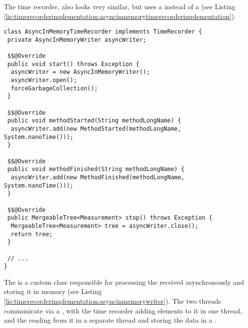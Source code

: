 \noindent The time recorder, also looks very similar, but uses a  instead of a  (see Listing \ref{lis:timerecorderimplementation:asyncinmemorytimerecorderimplementation}).

\noindent\begin{minipage}[c]{\linewidth}
\begin{lstlisting}[breaklines,caption={Async and in-memory time recorder implementation},label=lis:timerecorderimplementation:asyncinmemorytimerecorderimplementation]
class AsyncInMemoryTimeRecorder implements TimeRecorder {
 private AsyncInMemoryWriter asyncWriter;

 $$@Override
 public void start() throws Exception {
  asyncWriter = new AsyncInMemoryWriter();
  asyncWriter.open();
  forceGarbageCollection();
 }

 $$@Override
 public void methodStarted(String methodLongName) {
  asyncWriter.add(new MethodStarted(methodLongName, System.nanoTime()));
 }

 $$@Override
 public void methodFinished(String methodLongName) {
  asyncWriter.add(new MethodFinished(methodLongName, System.nanoTime()));
 }

 $$@Override
 public MergeableTree<Measurement> stop() throws Exception {
  MergeableTree<Measurement> tree = asyncWriter.close();
  return tree;
 }

 // ...
}
\end{lstlisting}
\end{minipage}

\noindent The  is a custom class responsible for processing the received  asynchronously and storing it in memory (see Listing \ref{lis:timerecorderimplementation:asyncinmemorywriter}). The two threads communicate via a , with the time recorder adding elements to it in one thread, and the  reading from it in a separate thread and storing the data in a .

